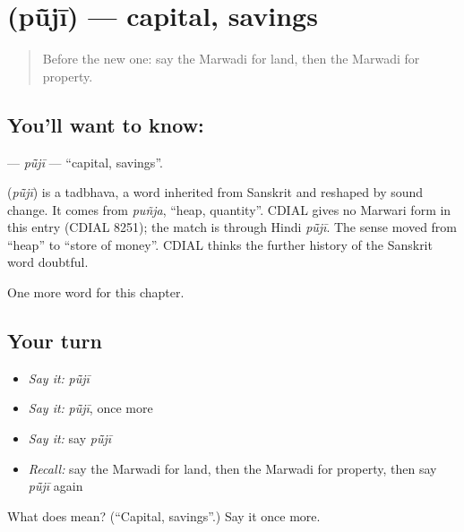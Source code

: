 \section[\texorpdfstring{\mw{पूंजी} (pū̃jī)}{पूंजी (pū̃jī)}]{ (pū̃jī) — capital, savings}

\label{lesson:MW-C115-puji}



\begin{quote}
Before the new one: say the Marwadi for land, then the Marwadi for property.
\end{quote}

\subsection*{You'll want to know: }
\textbf{} — \emph{pū̃jī} — \textquotedblleft{}capital, savings\textquotedblright{}.

\begin{cousinweb}
\textbf{} (\emph{pū̃jī}) is a tadbhava, a word inherited from Sanskrit and reshaped by sound change. It comes from \emph{puñja}, \textquotedblleft{}heap, quantity\textquotedblright{}. CDIAL gives no Marwari form in this entry (CDIAL 8251); the match is through Hindi \emph{pū̃jī}. The sense moved from \textquotedblleft{}heap\textquotedblright{} to \textquotedblleft{}store of money\textquotedblright{}. CDIAL thinks the further history of the Sanskrit word doubtful.
\end{cousinweb}

\begin{grammarlens}[title={What you've built}]
One more word for this chapter.
\end{grammarlens}

\subsection*{Your turn}
\begin{itemize}
\raggedright
  \item \emph{Say it:} \emph{pū̃jī}
  \item \emph{Say it:} \emph{pū̃jī}, once more
  \item \emph{Say it:} say \emph{pū̃jī}
  \item \emph{Recall:} say the Marwadi for land, then the Marwadi for property, then say \emph{pū̃jī} again
\end{itemize}

\begin{tcolorbox}[breakable,colback=teal!4,colframe=teal!35!black,title={Before you move on}]
What does  mean? (\textquotedblleft{}Capital, savings\textquotedblright{}.) Say it once more.
\end{tcolorbox}
